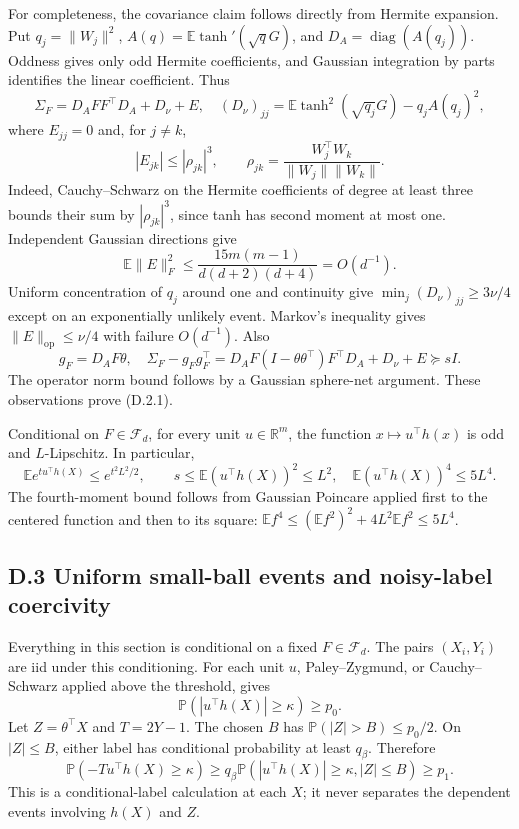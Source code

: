 \documentclass[
  11pt,
  a4paper,
]{article}
\begin{document}
For completeness, the covariance claim follows directly from Hermite
expansion. Put \(q_j=\|W_j\|^2\), \(A(q)=\mathbb E\tanh'(\sqrt qG)\),
and \(D_A=\operatorname{diag}(A(q_j))\). Oddness gives only odd Hermite
coefficients, and Gaussian integration by parts identifies the linear
coefficient. Thus \[
\Sigma_F=D_AFF^\top D_A+D_\nu+E,
\quad (D_\nu)_{jj}=\mathbb E\tanh^2(\sqrt{q_j}G)-q_jA(q_j)^2,
\tag{D.2.2}
\] where \(E_{jj}=0\) and, for \(j\ne k\), \[
|E_{jk}|\leq |\rho_{jk}|^3,\qquad
\rho_{jk}=\frac{W_j^\top W_k}{\|W_j\|\|W_k\|}.
\tag{D.2.3}
\] Indeed, Cauchy--Schwarz on the Hermite coefficients of degree at
least three bounds their sum by \(|\rho_{jk}|^3\), since tanh has second
moment at most one. Independent Gaussian directions give \[
\mathbb E\|E\|_F^2\leq
\frac{15m(m-1)}{d(d+2)(d+4)}=O(d^{-1}).
\tag{D.2.4}
\] Uniform concentration of \(q_j\) around one and continuity give
\(\min_j(D_\nu)_{jj}\geq3\nu/4\) except on an exponentially unlikely
event. Markov's inequality gives \(\|E\|_{\mathrm{op}}\leq\nu/4\) with
failure \(O(d^{-1})\). Also \[
g_F=D_AF\theta,
\quad
\Sigma_F-g_Fg_F^\top
=D_AF(I-\theta\theta^\top)F^\top D_A+D_\nu+E\succeq sI.
\tag{D.2.5}
\] The operator norm bound follows by a Gaussian sphere-net argument.
These observations prove (D.2.1).

Conditional on \(F\in\mathcal F_d\), for every unit \(u\in\mathbb R^m\),
the function \(x\mapsto u^\top h(x)\) is odd and \(L\)-Lipschitz. In
particular, \[
\mathbb E e^{t u^\top h(X)}\leq e^{t^2L^2/2},\qquad
s\leq\mathbb E(u^\top h(X))^2\leq L^2,
\quad
\mathbb E(u^\top h(X))^4\leq5L^4.
\tag{D.2.6}
\] The fourth-moment bound follows from Gaussian Poincare applied first
to the centered function and then to its square:
\(\mathbb E f^4\leq(\mathbb E f^2)^2+4L^2\mathbb E f^2\leq5L^4\).

\hypertarget{d.3-uniform-small-ball-events-and-noisy-label-coercivity}{%
\subsection{D.3 Uniform small-ball events and noisy-label
coercivity}\label{d.3-uniform-small-ball-events-and-noisy-label-coercivity}}

Everything in this section is conditional on a fixed
\(F\in\mathcal F_d\). The pairs \((X_i,Y_i)\) are iid under this
conditioning. For each unit \(u\), Paley--Zygmund, or Cauchy--Schwarz
applied above the threshold, gives \[
\mathbb P(|u^\top h(X)|\geq\kappa)\geq p_0.
\tag{D.3.1}
\] Let \(Z=\theta^\top X\) and \(T=2Y-1\). The chosen \(B\) has
\(\mathbb P(|Z|>B)\leq p_0/2\). On \(|Z|\leq B\), either label has
conditional probability at least \(q_\beta\). Therefore \[
\mathbb P(-T u^\top h(X)\geq\kappa)
\geq q_\beta\mathbb P(|u^\top h(X)|\geq\kappa,|Z|\leq B)
\geq p_1.
\tag{D.3.2}
\] This is a conditional-label calculation at each \(X\); it never
separates the dependent events involving \(h(X)\) and \(Z\).
\end{document}
